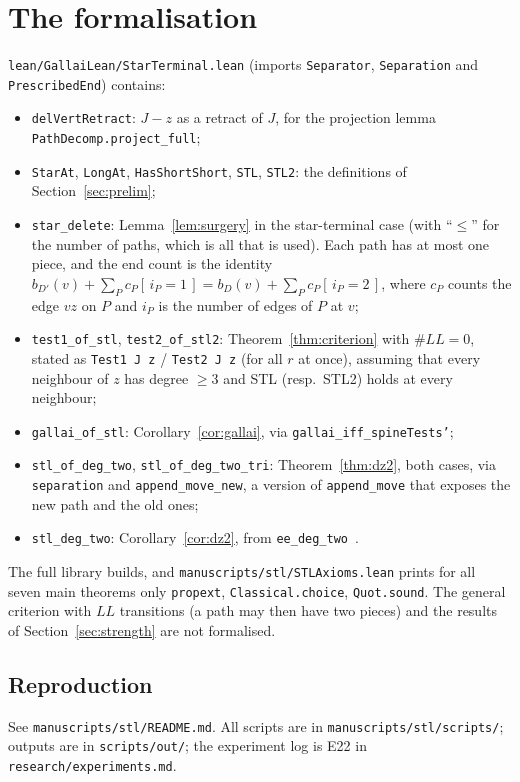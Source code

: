 \documentclass[11pt]{amsart}
\theoremstyle{definition}
\newcommand{\ind}[1]{[\,#1\,]}
\begin{document}
\section{The formalisation}\label{sec:lean}
\texttt{lean/GallaiLean/StarTerminal.lean} (imports \texttt{Separator}, \texttt{Separation} and
\texttt{PrescribedEnd}) contains:
\begin{itemize}
\item \texttt{delVertRetract}: $J-z$ as a retract of $J$, for the projection lemma
\texttt{PathDecomp.project\_full};
\item \texttt{StarAt}, \texttt{LongAt}, \texttt{HasShortShort}, \texttt{STL}, \texttt{STL2}:
the definitions of Section~\ref{sec:prelim};
\item \texttt{star\_delete}: Lemma~\ref{lem:surgery} in the star-terminal case (with ``$\le$'' for
the number of paths, which is all that is used). Each path has at
most one piece, and the end count is the identity
$b_{D'}(v)+\sum_Pc_P\ind{i_P=1}=b_D(v)+\sum_Pc_P\ind{i_P=2}$, where $c_P$ counts the edge $vz$ on
$P$ and $i_P$ is the number of edges of $P$ at $v$;
\item \texttt{test1\_of\_stl}, \texttt{test2\_of\_stl2}: Theorem~\ref{thm:criterion} with
$\#LL=0$, stated as \texttt{Test1 J z} / \texttt{Test2 J z} (for all $r$ at once), assuming that
every neighbour of $z$ has degree $\ge3$ and STL (resp.\ STL2) holds at every neighbour;
\item \texttt{gallai\_of\_stl}: Corollary~\ref{cor:gallai}, via
\texttt{gallai\_iff\_spineTests'};
\item \texttt{stl\_of\_deg\_two}, \texttt{stl\_of\_deg\_two\_tri}: Theorem~\ref{thm:dz2}, both
cases, via \texttt{separation} and \texttt{append\_move\_new}, a version of \texttt{append\_move}
that exposes the new path and the old ones;
\item \texttt{stl\_deg\_two}: Corollary~\ref{cor:dz2}, from \texttt{ee\_deg\_two}~\cite{PE}.
\end{itemize}
The full library builds, and \texttt{manuscripts/stl/STLAxioms.lean} prints for all seven main
theorems only \texttt{propext}, \texttt{Classical.choice}, \texttt{Quot.sound}. The general
criterion with $LL$ transitions (a path may then have two pieces) and the results of
Section~\ref{sec:strength} are not formalised.

\subsection*{Reproduction}
See \texttt{manuscripts/stl/README.md}. All scripts are in \texttt{manuscripts/stl/scripts/};
outputs are in \texttt{scripts/out/}; the experiment log is E22 in
\texttt{research/experiments.md}.
\end{document}
